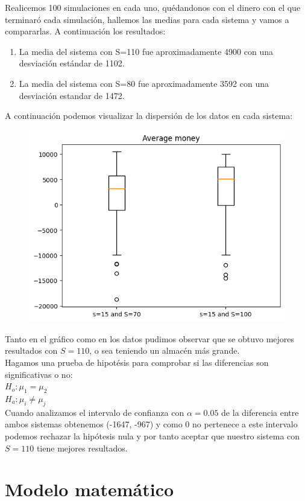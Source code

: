 \documentclass{article}
\begin{document}
Realicemos 100 simulaciones en cada uno, quédandonos con el dinero con el que terminaró cada simulación, hallemos las medias para cada sistema y vamos a compararlas. A continuación los resultados:
\begin{enumerate}
    \item La media del sistema con {S=110} fue aproximadamente 4900 con una desviación estándar de 1102.
    \item La media del sistema con {S=80} fue aproximadamente 3592 con una desviación estandar de 1472.
\end{enumerate}

A continuación podemos visualizar la dispersión de los datos en cada sistema:

\begin{figure}[H]
    \centering
    \includegraphics[width=0.7\linewidth]{./output.png}
    \label{fig:enter-label}
\end{figure}

Tanto en el gráfico como en los datos pudimos observar que se obtuvo mejores resultados con $S = 110$, o sea teniendo un almacén más grande.\\

Hagamos una prueba de hipotésis para comprobar si las diferencias son significativas o no: \\
    $H_o: \mu_1 = \mu_2 $\\
    $H_a: \mu_i \neq \mu_j$ \\
Cuando analizamos el intervalo de confianza con $\alpha=0.05$ de la diferencia entre ambos sistemas obtenemos  (-1647, -967) y como 0 no pertenece a este intervalo podemos rechazar la hipótesis nula y por tanto aceptar que nuestro sistema con $S=110$ tiene mejores resultados.

\section*{Modelo matemático}
\end{document}
